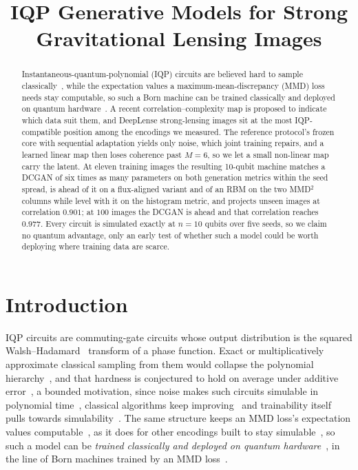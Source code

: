 \documentclass{article}
\title{IQP Generative Models for Strong Gravitational Lensing Images}
\author{}
\begin{document}
\maketitle

\begin{abstract}
Instantaneous-quantum-polynomial (IQP) circuits are believed hard to sample
classically~\cite{bremner_2011_classical,bremner_2016_average}, while the expectation values a
maximum-mean-discrepancy (MMD) loss needs stay computable, so such a Born machine can be trained
classically and deployed on quantum hardware~\cite{recio_2025_train}. A recent
correlation--complexity map is proposed to indicate which data suit them, and DeepLense
strong-lensing images sit at the most IQP-compatible position among the encodings we measured. The
reference protocol's frozen core with sequential
adaptation yields only noise, which joint training repairs, and a learned linear map then loses
coherence past $M{=}6$, so we let a small non-linear map carry the latent. At eleven training images
the resulting 10-qubit machine matches a DCGAN of six times as many parameters on both generation
metrics within the seed spread, is ahead of it on a flux-aligned variant and of an RBM on the two
MMD$^2$ columns while level with it on the histogram metric, and projects unseen images at
correlation $0.901$; at $100$ images the DCGAN is ahead and that correlation reaches $0.977$. Every
circuit is simulated exactly at $n=10$ qubits over five seeds, so we claim no quantum advantage, only
an early test of whether such a model could be worth deploying where training data are scarce.
\end{abstract}

\section{Introduction}
\label{sec:intro}

IQP circuits are commuting-gate circuits whose output distribution is the squared
Walsh--Hadamard~\cite{walsh_1923_closed} transform of a phase function. Exact or multiplicatively
approximate classical sampling from them would collapse the polynomial
hierarchy~\cite{bremner_2011_classical}, and that hardness is conjectured to hold on average under
additive error~\cite{bremner_2016_average}, a bounded motivation, since noise makes such circuits
simulable in polynomial time~\cite{rajakumar_2024_polynomial}, classical algorithms keep
improving~\cite{maslov_2024_fast} and trainability itself pulls towards
simulability~\cite{cerezo_2025_does}. The same structure keeps an MMD loss's expectation values
computable~\cite{recio_2025_iqpopt}, as it does for other encodings built to stay
simulable~\cite{lizziobosco_2026_pauli}, so such a model can be \emph{trained
classically and deployed on quantum hardware}~\cite{recio_2025_train}, in the line of Born machines
trained by an MMD loss~\cite{liu_2018_differentiable,benedetti_2019_generative,coyle_2020_born}.
\end{document}
